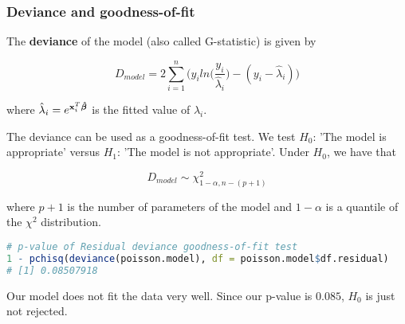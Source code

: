 \documentclass[border=5mm, convert, usenames, dvipsnames,beamer]{standalone}
\begin{document}
\begin{frame}[ fragile]{}
\frametitle{Deviance and goodness-of-fit}

\footnotesize
\vspace{15mm}
\noindent
The \textbf{deviance} of the model (also called G-statistic)  is given by

$$
D_{model} = 2 \sum_{i=1}^{n} \bigg( y_{i} ln\bigg( \frac{y_{i}}{\hat{\lambda}_{i}} \bigg) - (y_{i} - \hat{\lambda}_{i}) \bigg)
$$

\noindent
where $\hat{\lambda}_{i} =  e^{ \bold{x}_{i}^{T} \boldsymbol{\hat{\beta}}}$ is the fitted value of $\lambda_{i}$.


\vspace{3mm}
\noindent
The deviance can be used as a goodness-of-fit test. We test $H_{0}$: 'The model is appropriate' versus $H_{1}$: 'The model is not appropriate'. Under $H_{0}$, we have that

$$
D_{model} \sim \chi_{1-\alpha, n-(p+1)}^{2}
$$

\vspace{2mm}
\noindent
where $p+1$ is the number of parameters of the model and $1-\alpha$ is a quantile of the $\chi^{2}$ distribution.
\par 


\tiny
\begin{lstlisting}[language=R]
# p-value of Residual deviance goodness-of-fit test
1 - pchisq(deviance(poisson.model), df = poisson.model$df.residual)
# [1] 0.08507918
\end{lstlisting}
\par

\footnotesize
\vspace{2mm}
\noindent
{\color{purple} Our model does not fit the data very well.} Since our p-value is $0.085$, $H_{0}$ is just not rejected.

\par
\end{frame}
\end{document}
